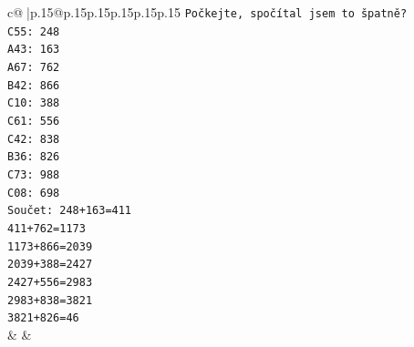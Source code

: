 \documentclass{article}
\begin{document}
{\begin{supertabular}{c@{$\;$}|p{.15\linewidth}@{}p{.15\linewidth}p{.15\linewidth}p{.15\linewidth}p{.15\linewidth}p{.15\linewidth}}
{{{\texttt{Počkejte, spočítal jsem to špatně?} \\
\texttt{C55: 248} \\
\texttt{A43: 163} \\
\texttt{A67: 762} \\
\texttt{B42: 866} \\
\texttt{C10: 388} \\
\texttt{C61: 556} \\
\texttt{C42: 838} \\
\texttt{B36: 826} \\
\texttt{C73: 988} \\
\texttt{C08: 698} \\
\texttt{Součet: 248+163=411} \\
\texttt{411+762=1173} \\
\texttt{1173+866=2039} \\
\texttt{2039+388=2427} \\
\texttt{2427+556=2983} \\
\texttt{2983+838=3821} \\
\texttt{3821+826=46} \\
            }
        }
    }
    & & \\ \\


\end{supertabular}}
\end{document}
